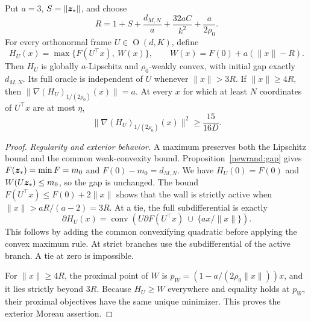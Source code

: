 {\begin{lemma}
\label{newrand:wall}
Put $a=3$, $S=\|\bm{z}_*\|$, and choose
\begin{equation}
 R=1+S+\frac{d_{M,N}}a+\frac{32aC}{k^2}
       +\frac{a}{2\rho_0}.
 \label{newrand:wall-radius}
\end{equation}
For every orthonormal frame $U\in\operatorname O(d,K)$, define
\begin{equation}
 H_U(x)=\max\{F(U^\top x),\ W(x)\},\qquad
 W(x)=F(0)+a(\|x\|-R).
 \label{newrand:wall-definition}
\end{equation}
Then $H_U$ is globally $a$-Lipschitz and $\rho_0$-weakly convex,
with initial gap exactly $d_{M,N}$.  Its full oracle is independent
of $U$ whenever $\|x\|>3R$.  If $\|x\|\ge4R$, then
$\|\nabla(H_U)_{1/(2\rho_0)}(x)\|=a$.  At every $x$ for which
at least $N$ coordinates of $U^\top x$ are at most $\eta$,
\begin{equation}
 \|\nabla(H_U)_{1/(2\rho_0)}(x)\|^2
 \ge\frac{15}{16D}.
 \label{newrand:wall-barrier}
\end{equation}
\end{lemma}
\begin{proof}
\emph{Regularity and exterior behavior.}
A maximum preserves both the Lipschitz bound and the common
weak-convexity bound. Proposition~\ref{newrand:gap} gives
$F(\bm{z}_*)=\min F=m_0$ and $F(0)-m_0=d_{M,N}$.
We have $H_U(0)=F(0)$ and $W(U\bm{z}_*)\le m_0$, so the gap is unchanged.
The bound $F(U^\top x)\le F(0)+2\|x\|$ shows that the wall is
strictly active when $\|x\|>aR/(a-2)=3R$.
At a tie, the full subdifferential is exactly
\begin{equation}
 \partial H_U(x)=\operatorname{conv}
 \left(U\partial F(U^\top x)\ \cup\
       \{a x/\|x\|\}\right).
 \label{newrand:wall-full-oracle}
\end{equation}
This follows by adding the common convexifying quadratic before
applying the convex maximum rule.  At strict branches use the
subdifferential of the active branch.  A tie at zero is impossible.

For $\|x\|\ge4R$, the proximal point of $W$ is
$p_W=(1-a/(2\rho_0\|x\|))x$, and it lies strictly beyond $3R$.
Because $H_U\ge W$ everywhere and equality holds at $p_W$, their
proximal objectives have the same unique minimizer.  This proves
the exterior Moreau assertion.


\end{proof}}
